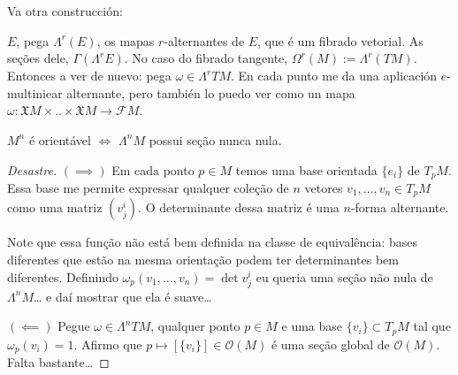 Va otra construcción:

\(E\), pega \(\Lambda^{r}(E)\), os mapas \(r\)-alternantes de \(E\), que é um fibrado vetorial. As seções dele,  \(\Gamma(\Lambda^{r}E)\). No caso do fibrado tangente, \(\Omega^r(M):= \Lambda^{r}(TM)\). Entonces a ver de nuevo: pega \(\omega \in \Lambda^{r}TM\). En cada punto me da una aplicación \(e\)-multiniear alternante, pero también lo puedo ver como un mapa \(\omega: \mathfrak{X} M\times .. \times \mathfrak{X}M \to \mathcal{F}M\).

\begin{exercise}\leavevmode
\(M^n\) é orientável \(\iff\) \(\Lambda^{n}M\) possui seção nunca nula.
\end{exercise}

\begin{proof}[Desastre]\leavevmode
\((\implies )\) Em cada ponto \(p \in M\) temos uma base orientada \(\{e_i\}\) de \(T_pM\). Essa base me permite expressar qualquer coleção de \(n\) vetores \(v_1,\ldots,v_n \in T_pM\) como uma matriz \((v^i_{j})\). O determinante dessa matriz é uma \(n\)-forma alternante. 

Note que essa função {\color{2}não} está bem definida na classe de equivalência: bases diferentes que estão na mesma orientação podem ter determinantes bem diferentes. Definindo  \(\omega_p(v_1,\ldots,v_n)=\det v^i_j\) eu queria uma seção não nula de \(\Lambda^{n}M\)… e daí mostrar que ela é suave…

\((\impliedby)\) Pegue \(\omega \in \Lambda^{n}TM\), qualquer ponto \(p \in M\) e uma base \(\{v_i\}\subset T_pM\) tal que \(\omega_p(v_i)=1\). Afirmo que \(p \mapsto [\{v_i\}]\in \mathcal{O}(M)\) é uma seção global de \(\mathcal{O}(M)\). {\color{2}Falta bastante…}

\end{proof}

